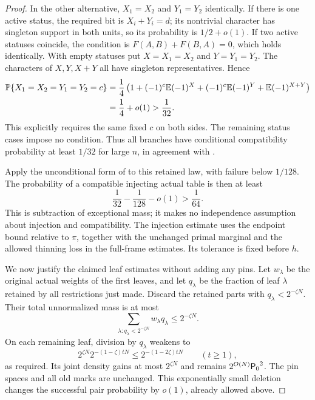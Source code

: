 \begin{proof}
In the other alternative, \(X_1=X_2\) and \(Y_1=Y_2\)
identically.  If there is one active status, the required bit is
\(X_i+Y_i=d\); its nontrivial character has singleton support in
both units, so its probability is \(1/2+o(1)\).  If two active
statuses coincide, the condition is
\(F(A,B)+F(B,A)=0\), which holds identically.  With empty statuses
put \(X=X_1=X_2\) and \(Y=Y_1=Y_2\).  The characters of
\(X,Y,X+Y\) all have singleton representatives.  Hence
\begin{align*}
 \mathbb P\{X_1=X_2=Y_1=Y_2=c\}
 &=\frac14\left(1+(-1)^c\mathbb E(-1)^X
                    +(-1)^c\mathbb E(-1)^Y+\mathbb E(-1)^{X+Y}\right)\\
 &=\frac14+o(1)>\frac1{32}.
\end{align*}
This explicitly requires the same fixed \(c\) on both sides.
The remaining status cases impose no condition.  Thus all branches
have conditional compatibility probability at least \(1/32\) for
large \(n\), in agreement with .

Apply the unconditional form of  to this
retained law, with failure below \(1/128\).  The probability of a
compatible injecting actual table is then at least
\[
 \frac1{32}-\frac1{128}-o(1)>\frac1{64}.
\]
This is subtraction of exceptional mass; it makes no independence
assumption about injection and compatibility.  The injection
estimate uses the endpoint bound relative to \(\pi\), together
with the unchanged primal marginal and the allowed thinning loss
in the full-frame estimates.  Its tolerance is fixed before \(h\).

We now justify the claimed leaf estimates without adding any pins.
Let \(w_\lambda\) be the original actual weights of the first
leaves, and let \(q_\lambda\) be the fraction of leaf \(\lambda\)
retained by all restrictions just made.  Discard the retained parts
with \(q_\lambda<2^{-\zeta N}\).  Their total unnormalized mass
is at most
\[
 \sum_{\lambda:q_\lambda<2^{-\zeta N}}
       w_\lambda q_\lambda\le 2^{-\zeta N}.
\]
On each remaining leaf, division by \(q_\lambda\) weakens
 to
\[
 2^{\zeta N}2^{-(1-\zeta)tN}
 \le 2^{-(1-2\zeta)tN}\qquad(t\ge1),
\]
as required.  Its joint density gains at most \(2^{\zeta N}\)
and remains \(2^{O(N)}{\mathsf P_0}^2\).  The pin spaces and all old
marks are unchanged.  This exponentially small deletion changes
the successful pair probability by \(o(1)\), already allowed above.


\end{proof}
